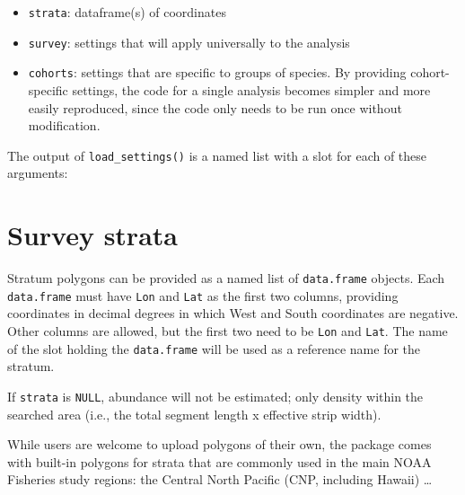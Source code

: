 \documentclass[
]{book}
\newenvironment{Shaded}{\begin{snugshade}}{\end{snugshade}}
\newcommand{\DecValTok}[1]{\textcolor[rgb]{0.00,0.00,0.81}{#1}}
\newcommand{\NormalTok}[1]{#1}
\newcommand{\OperatorTok}[1]{\textcolor[rgb]{0.81,0.36,0.00}{\textbf{#1}}}
\newcommand{\StringTok}[1]{\textcolor[rgb]{0.31,0.60,0.02}{#1}}
\begin{document}
\begin{itemize}
\item
  \texttt{strata}: dataframe(s) of coordinates
\item
  \texttt{survey}: settings that will apply universally to the analysis
\item
  \texttt{cohorts}: settings that are specific to groups of species. By providing cohort-specific settings, the code for a single analysis becomes simpler and more easily reproduced, since the code only needs to be run once without modification.
\end{itemize}

The output of \texttt{load\_settings()} is a named list with a slot for each of these arguments:

\begin{Shaded}
\end{Shaded}

\hypertarget{survey-strata}{%
\section*{Survey strata}\label{survey-strata}}

Stratum polygons can be provided as a named list of \texttt{data.frame} objects. Each \texttt{data.frame} must have \texttt{Lon} and \texttt{Lat} as the first two columns, providing coordinates in decimal degrees in which West and South coordinates are negative. Other columns are allowed, but the first two need to be \texttt{Lon} and \texttt{Lat}. The name of the slot holding the \texttt{data.frame} will be used as a reference name for the stratum.

If \texttt{strata} is \texttt{NULL}, abundance will not be estimated; only density within the searched area (i.e., the total segment length x effective strip width).

While users are welcome to upload polygons of their own, the package comes with built-in polygons for strata that are commonly used in the main NOAA Fisheries study regions: the Central North Pacific (CNP, including Hawaii) \ldots{}
\end{document}
